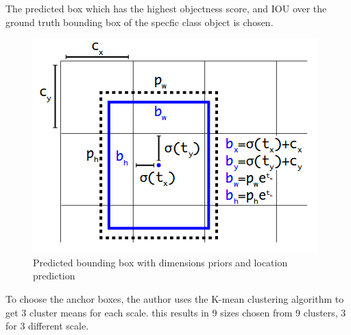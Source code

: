The predicted box which has the highest objectness score, and IOU over the ground truth bounding box of the specfic class object is chosen.
\begin{figure}[h!]
    \centering
    \includegraphics[scale=0.5]{Chapters/Fig/yolo_bounding_box.png}
    \caption{Predicted bounding box with dimensions priors and location prediction}
    \label{fig:bounding_box}
\end{figure}
\par
To choose the anchor boxes, the author uses the K-mean clustering algorithm to get 3 cluster means for each scale. this results in 9 sizes chosen from 9 clusters, 3 for 3 different scale.
